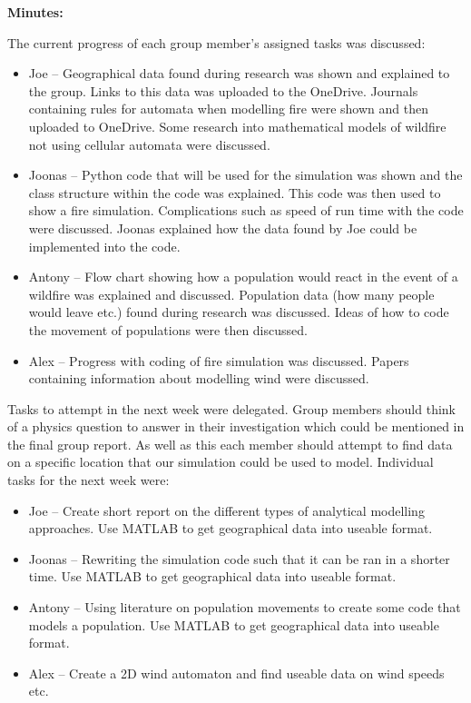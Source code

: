 \noindent \textbf{Minutes:}

The current progress of each group member’s assigned tasks was discussed:

\begin{itemize}
    \item Joe – Geographical data found during research was shown and explained to the group. Links to this data was uploaded to the OneDrive. Journals containing rules for automata when modelling fire were shown and then uploaded to OneDrive. Some research into mathematical models of wildfire not using cellular automata were discussed.
    \item Joonas – Python code that will be used for the simulation was shown and the class structure within the code was explained. This code was then used to show a fire simulation. Complications such as speed of run time with the code were discussed. Joonas explained how the data found by Joe could be implemented into the code.
    \item Antony – Flow chart showing how a population would react in the event of a wildfire was explained and discussed. Population data (how many people would leave etc.)  found during research was discussed. Ideas of how to code the movement of populations were then discussed.
    \item Alex – Progress with coding of fire simulation was discussed. Papers containing information about modelling wind were discussed.
\end{itemize}

\noindent Tasks to attempt in the next week were delegated. Group members should think of a physics question to answer in their investigation which could be mentioned in the final group report. As well as this each member should attempt to find data on a specific location that our simulation could be used to model. Individual tasks for the next week were:

\begin{itemize}
    \item Joe – Create short report on the different types of analytical modelling approaches. Use MATLAB to get geographical data into useable format.
    \item Joonas – Rewriting the simulation code such that it can be ran in a shorter time. Use MATLAB to get geographical data into useable format.
    \item Antony – Using literature on population movements to create some code that models a population. Use MATLAB to get geographical data into useable format.
    \item Alex – Create a 2D wind automaton and find useable data on wind speeds etc. 
\end{itemize}
\clearpage


